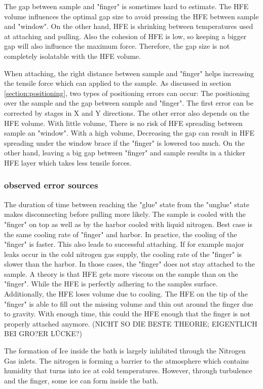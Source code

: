 The gap between sample and "finger" is sometimes hard to estimate. The HFE volume influences the optimal gap size to avoid pressing the HFE between sample and "window". On the other hand, HFE is shrinking between temperatures used at attaching and pulling. Also the cohesion of HFE is low, so keeping a bigger gap will also influence the maximum force. Therefore, the gap size is not completely isolatable with the HFE volume.

When attaching, the right distance between sample and "finger" helps increasing the tensile force which can applied to the sample. As discussed in section \ref{section:positioning}, two types of positioning errors can occur: The positioning over the sample and the gap between sample and "finger". The first error can be corrected by stages in X and Y directions. The other error also depends on the HFE volume. With little volume, There is no risk of HFE spreading between sample an "window". With a high volume, Decreasing the gap can result in HFE spreading under the window brace if the "finger" is lowered too much. On the other hand, leaving a big gap between "finger" and sample results in a thicker HFE layer which takes less tensile forces.

\subsubsection{observed error sources}

The duration of time between reaching the "glue" state from the "unglue" state makes disconnecting before pulling more likely. The sample is cooled with the "finger" on top as well as by the harbor cooled with liquid nitrogen. Best case is the same cooling rate of "finger" and harbor. In practice, the cooling of the "finger" is faster. This also leads to successful attaching. If for example major leaks occur in the cold nitrogen gas supply, the cooling rate of the "finger" is slower than the harbor. In those cases, the "finger" does not stay attached to the sample. A theory is that HFE gets more viscous on the sample than on the "finger". While the HFE is perfectly adhering to the samples surface. Additionally, the HFE loses volume due to cooling. The HFE on the tip of the "finger" is able to fill out the missing volume and thin out around the finger due to gravity. With enough time, this could the HFE enough that the finger is not properly attached anymore. (NICHT SO DIE BESTE THEORIE; EIGENTLICH BEI GRO?ER LÜCKE?)

The formation of Ice inside the bath is largely inhibited through the Nitrogen Gas inlets. The nitrogen is forming a barrier to the atmosphere which contains humidity that turns into ice at cold temperatures. However, through turbulence and the finger, some ice can form inside the bath. 

